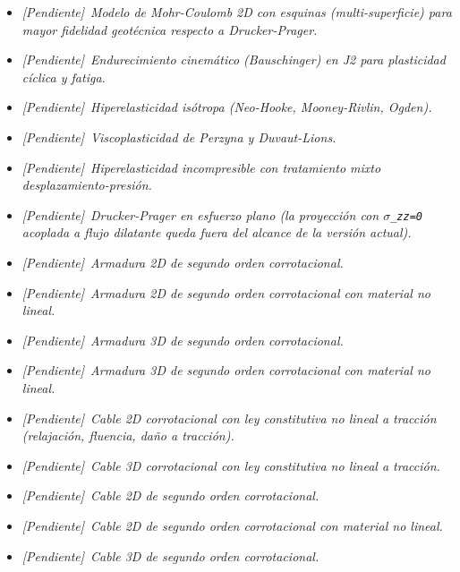 \documentclass[11pt,oneside]{report}
\newcommand{\pendiente}[1]{\textcolor{pendienteorange}{\textit{[Pendiente]}~\textcolor{pendienteorange}{\textit{#1}}}}
\begin{document}
\begin{itemize}

  \item \pendiente{Modelo de Mohr-Coulomb 2D con esquinas (multi-superficie) para mayor fidelidad geotécnica respecto a Drucker-Prager.}

  \item \pendiente{Endurecimiento cinemático (Bauschinger) en J2 para plasticidad cíclica y fatiga.}

  \item \pendiente{Hiperelasticidad isótropa (Neo-Hooke, Mooney-Rivlin, Ogden).}

  \item \pendiente{Viscoplasticidad de Perzyna y Duvaut-Lions.}

  \item \pendiente{Hiperelasticidad incompresible con tratamiento mixto desplazamiento-presión.}

  \item \pendiente{Drucker-Prager en esfuerzo plano (la proyección con \texttt{\ensuremath{\sigma}\_zz=0} acoplada a flujo dilatante queda fuera del alcance de la versión actual).}

  \item \pendiente{Armadura 2D de segundo orden corrotacional.}

  \item \pendiente{Armadura 2D de segundo orden corrotacional con material no lineal.}

  \item \pendiente{Armadura 3D de segundo orden corrotacional.}

  \item \pendiente{Armadura 3D de segundo orden corrotacional con material no lineal.}

  \item \pendiente{Cable 2D corrotacional con ley constitutiva no lineal a tracción (relajación, fluencia, daño a tracción).}

  \item \pendiente{Cable 3D corrotacional con ley constitutiva no lineal a tracción.}

  \item \pendiente{Cable 2D de segundo orden corrotacional.}

  \item \pendiente{Cable 2D de segundo orden corrotacional con material no lineal.}

  \item \pendiente{Cable 3D de segundo orden corrotacional.}


\end{itemize}
\end{document}
